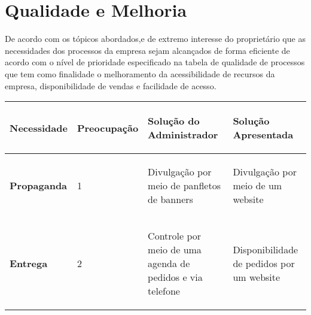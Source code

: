 \newpage \section{Qualidade e Melhoria}

De acordo com os tópicos abordados,e de extremo interesse do proprietário que as necessidades dos processos da empresa sejam alcançados de forma eficiente de acordo com o nível de  prioridade especificado na tabela de qualidade de processos que tem como finalidade o melhoramento da acessibilidade de recursos da empresa, disponibilidade de vendas e facilidade de acesso. 

\begin{table}[H]
    \centering
      \begin{tabular}{| m{4cm} | m{4cm} | m{4cm} | m{4cm} |}
        \hline
        \begin{center} \textbf{Necessidade} \end{center}  & \begin{center} \textbf{Preocupação} \end{center}  & \begin{center} \textbf{Solução do Administrador} \end{center} & \begin{center} \textbf{Solução Apresentada} \end{center}    \\ \hline
        \begin{center} \textbf{Propaganda} \end{center}  & \begin{center} 1 \end{center}  & \begin{center} Divulgação por meio de panfletos de banners \end{center} & \begin{center} Divulgação por meio de um website \end{center}    \\ \hline
        \begin{center} \textbf{Entrega} \end{center}  & \begin{center} 2 \end{center}  & \begin{center} Controle por meio de uma agenda de pedidos e via telefone \end{center} & \begin{center} Disponibilidade de pedidos por um website \end{center}    \\ \hline

\end{tabular}
\end{table}
